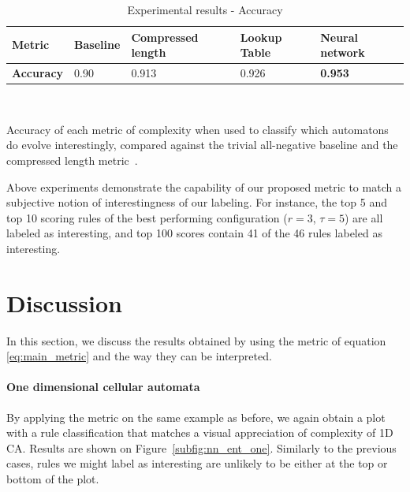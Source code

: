 \begin{table}[t!]
  \renewcommand{\arraystretch}{1.2}
  \caption{Experimental results - Accuracy}
  \label{experiments_table2}
  \centering
  \begin{tabular}{lm{.1\linewidth}m{.16\linewidth}m{.1\linewidth}m{.11\linewidth}}
    \toprule
    \bfseries  Metric & Baseline & Compressed length
    \parencite{zenilCompressionBasedInvestigationDynamical2010} &
    Lookup Table & Neural network \\ \midrule
    \bfseries Accuracy & 0.90 & 0.913 & 0.926 & \bfseries 0.953 \\ \bottomrule
  \end{tabular}
  \\[+8pt]
  \begin{flushleft}{\footnotesize Accuracy of each metric of complexity when
      used to classify which automatons do evolve interestingly, compared
      against the trivial all-negative baseline and the compressed length
      metric~\parencite{zenilCompressionBasedInvestigationDynamical2010}.}\end{flushleft}
\end{table}

Above experiments demonstrate the capability of our proposed metric to match a
subjective notion of interestingness of our labeling. For instance, the top 5
and top 10 scoring rules of the best performing configuration ($r=3$, $\tau =
5$) are all labeled as interesting, and top 100 scores contain 41 of the 46
rules labeled as interesting.

\section{Discussion}

In this section, we discuss the results obtained by using the metric of equation
\eqref{eq:main_metric} and the way they can be interpreted.

\paragraph{One dimensional cellular automata}
By applying the metric on the same example as before, we again obtain a
plot with a rule classification that matches a visual appreciation of
complexity of 1D CA. Results are shown on Figure~\ref{subfig:nn_ent_one}.
Similarly to the previous cases, rules we might label as interesting are
unlikely to be either at the top or bottom of the plot.

